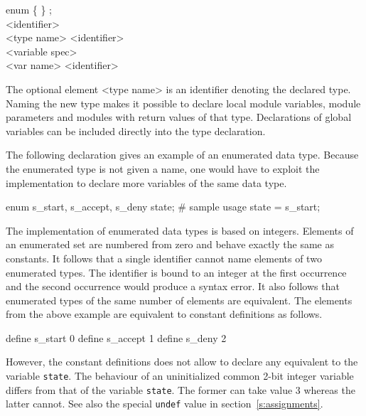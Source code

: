 \documentclass[a4paper,11pt,titlepage,english]{article}
\begin{document}
\begin{bnfgrammar}
 \is  enum  \{
                        \}  ;
                        \\
[enum element] \is <identifier> \\
<type name> \is <identifier> \\
<variable spec> \optional{[<dimen>]}\optional{[<dimen>]}\\
<var name> \is <identifier> \\
\end{bnfgrammar}

The optional element <type name> is an identifier denoting the declared
type. Naming the new type makes it possible to declare local module
variables, module parameters and modules with return values of that type.
Declarations of global variables can be included directly into the type
declaration.

The following declaration gives an example of an enumerated data type.
Because the enumerated type is not given a name, one would have to exploit
the implementation to declare more variables of the same data type.

\begin{RemoplaSnippet}
    enum {
        s_start, s_accept, s_deny 
    } state;
    # sample usage
    state = s_start;
\end{RemoplaSnippet}

The implementation of enumerated data types is based on integers. Elements
of an enumerated set are numbered from zero and behave exactly the same as
constants. It follows that a single identifier cannot name elements of two
enumerated types. The identifier is bound to an integer at the first
occurrence and the second occurrence would produce a syntax error. It also
follows that enumerated types of the same number of elements are
equivalent. The elements from the above example are equivalent to constant
definitions as follows.

\begin{RemoplaSnippet}
    define s_start  0
    define s_accept 1
    define s_deny   2
\end{RemoplaSnippet}

However, the constant definitions does not allow to declare any equivalent
to the variable \verb|state|. The behaviour of an uninitialized common
2-bit integer variable differs from that of the variable \verb|state|. The
former can take value 3 whereas the latter cannot. See also the special
\verb|undef| value in section~\ref{s:assignments}.
\end{document}
